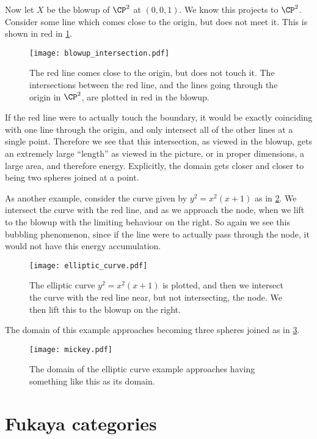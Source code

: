 \documentclass{amsart}
\begin{document}
Now let $X$ be the blowup of $\CP^2$ at $\left( 0,0,1 \right)$. 
We know this projects to $\CP^2$.
Consider some line which comes close to the origin, but does not meet it. 
This is shown in red in \cref{fig:blowup_intersection}.
\begin{figure}
\texttt{[image: blowup\_intersection.pdf]}
\caption{The red line comes close to the origin, but does not touch it. 
The intersections between the red line, and the lines going through the origin
in $\CP^2$, are plotted in red in the blowup.}
\label{fig:blowup_intersection}
\end{figure}
If the red line were to actually touch the boundary, it would be
exactly coinciding with one line through the origin, 
and only intersect all of the other lines at a single point. 
Therefore we see that this intersection, as viewed in the blowup,
gets an extremely large ``length'' as viewed in the picture, 
or in proper dimensions, a large area, and therefore energy. 
Explicitly, the domain gets closer and closer to being two spheres joined at a point.

As another example, consider the curve given by
$y^2 = x^2 \left( x + 1 \right)$ as in \cref{fig:elliptic_curve}.
We intersect the curve with the red line, and as we approach the node, 
when we lift to the blowup with the limiting behaviour on the right.
So again we see this bubbling phenomenon, since if the line were to actually pass through 
the node, it would not have this energy accumulation.

\begin{figure}
\texttt{[image: elliptic\_curve.pdf]}
\caption{The elliptic curve $y^2 = x^2\left( x + 1 \right)$ is plotted, and
then we intersect the curve with the red line near, but not intersecting,
the node. We then lift this to the blowup on the right.}
\label{fig:elliptic_curve}
\end{figure}

The domain of this example approaches becoming three spheres joined
as in \cref{fig:mickey}.

\begin{figure}
\texttt{[image: mickey.pdf]}
\caption{The domain of the elliptic curve example approaches having something like this
as its domain.}
\label{fig:mickey}
\end{figure}


\section{Fukaya categories}
\end{document}
